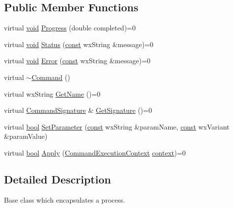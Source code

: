 \subsection*{Public Member Functions}
\begin{DoxyCompactItemize}
\item 
virtual \hyperlink{sound_8c_ae35f5844602719cf66324f4de2a658b3}{void} \hyperlink{class_command_a04602e7bef62556e7192819cdb8eab46}{Progress} (double completed)=0
\item 
virtual \hyperlink{sound_8c_ae35f5844602719cf66324f4de2a658b3}{void} \hyperlink{class_command_a5f67aec1f7a05da80720e42f1d3a25b6}{Status} (\hyperlink{getopt1_8c_a2c212835823e3c54a8ab6d95c652660e}{const} wx\+String \&message)=0
\item 
virtual \hyperlink{sound_8c_ae35f5844602719cf66324f4de2a658b3}{void} \hyperlink{class_command_ae2407050dcf9bb8021f82baccc91eca9}{Error} (\hyperlink{getopt1_8c_a2c212835823e3c54a8ab6d95c652660e}{const} wx\+String \&message)=0
\item 
virtual \hyperlink{class_command_a641c23ef533dd6f77d0a4ef0311598b2}{$\sim$\+Command} ()
\item 
virtual wx\+String \hyperlink{class_command_aac3a5ea5088cc1583ecb8bffc635ed30}{Get\+Name} ()=0
\item 
virtual \hyperlink{class_command_signature}{Command\+Signature} \& \hyperlink{class_command_a7f82156fd2f752189b3e0d60e79ea108}{Get\+Signature} ()=0
\item 
virtual \hyperlink{mac_2config_2i386_2lib-src_2libsoxr_2soxr-config_8h_abb452686968e48b67397da5f97445f5b}{bool} \hyperlink{class_command_aa6e50d954dc875274043154ebc9b1ea0}{Set\+Parameter} (\hyperlink{getopt1_8c_a2c212835823e3c54a8ab6d95c652660e}{const} wx\+String \&param\+Name, \hyperlink{getopt1_8c_a2c212835823e3c54a8ab6d95c652660e}{const} wx\+Variant \&param\+Value)
\item 
virtual \hyperlink{mac_2config_2i386_2lib-src_2libsoxr_2soxr-config_8h_abb452686968e48b67397da5f97445f5b}{bool} \hyperlink{class_command_ab3c00e81a4ed48c40730bc39399d65b7}{Apply} (\hyperlink{class_command_execution_context}{Command\+Execution\+Context} \hyperlink{structcontext}{context})=0
\end{DoxyCompactItemize}


\subsection{Detailed Description}
Base class which encapsulates a process. 

